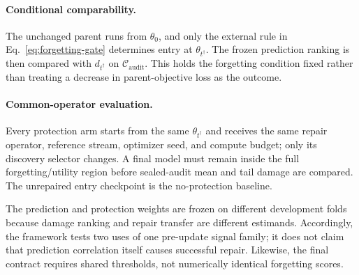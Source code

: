 \paragraph{Conditional comparability.}
The unchanged parent runs from $\theta_0$, and only the external rule in
Eq.~\eqref{eq:forgetting-gate} determines entry at
$\theta_{t^\dagger}$. The frozen prediction ranking is then compared with
$d_{t^\dagger}$ on $\mathcal C_{\mathrm{audit}}$. This holds the forgetting
condition fixed rather than treating a decrease in parent-objective loss as
the outcome.

\paragraph{Common-operator evaluation.}
Every protection arm starts from the same $\theta_{t^\dagger}$ and receives
the same repair operator, reference stream, optimizer seed, and compute
budget; only its discovery selector changes. A final model must remain inside
the full forgetting/utility region before sealed-audit mean and tail damage
are compared. The unrepaired entry checkpoint is the no-protection baseline.

The prediction and protection weights are frozen on different development
folds because damage ranking and repair transfer are different estimands.
Accordingly, the framework tests two uses of one pre-update signal family; it
does not claim that prediction correlation itself causes successful repair.
Likewise, the final contract requires shared thresholds, not numerically
identical forgetting scores.
